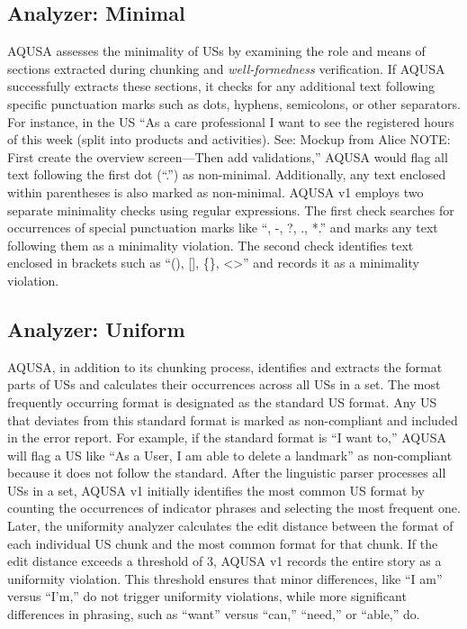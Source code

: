 \subsection*{\normalsize{Analyzer: Minimal}}
AQUSA assesses the minimality of USs by examining the role and means of sections extracted during chunking and \emph{well-formedness} verification. If AQUSA successfully extracts these sections, it checks for any additional text following specific punctuation marks such as dots, hyphens, semicolons, or other separators. For instance, in the US \enquote{As a care professional I want to see the registered hours of this week (split into products and activities). See: Mockup from Alice NOTE: First create the overview screen—Then add validations,} AQUSA would flag all text following the first dot (\enquote{.}) as non-minimal. Additionally, any text enclosed within parentheses is also marked as non-minimal.
AQUSA v1 employs two separate minimality checks using regular expressions. The first check searches for occurrences of special punctuation marks like \enquote{, -, ?, ., *.} and marks any text following them as a minimality violation. The second check identifies text enclosed in brackets such as \enquote{(), [], \{\}, \textless\textgreater} and records it as a minimality violation.
\subsection*{\normalsize{Analyzer: Uniform}}
AQUSA, in addition to its chunking process, identifies and extracts the format parts of USs and calculates their occurrences across all USs in a set. The most frequently occurring format is designated as the standard US format. Any US that deviates from this standard format is marked as non-compliant and included in the error report. For example, if the standard format is \enquote{I want to,} AQUSA will flag a US like \enquote{As a User, I am able to delete a landmark} as non-compliant because it does not follow the standard.
After the linguistic parser processes all USs in a set, AQUSA v1 initially identifies the most common US format by counting the occurrences of indicator phrases and selecting the most frequent one. Later, the uniformity analyzer calculates the edit distance between the format of each individual US chunk and the most common format for that chunk. If the edit distance exceeds a threshold of 3, AQUSA v1 records the entire story as a uniformity violation. This threshold ensures that minor differences, like \enquote{I am} versus \enquote{I'm,} do not trigger uniformity violations, while more significant differences in phrasing, such as \enquote{want} versus \enquote{can,} \enquote{need,} or \enquote{able,} do. 
